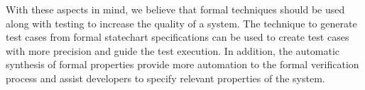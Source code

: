 With these aspects in mind, we believe that formal techniques should be used along with testing to increase the quality of a system. The technique to generate test cases from formal statechart specifications can be used to create test cases with more precision and guide the test execution. In addition, the automatic synthesis of formal properties provide more automation to the formal verification process and assist developers to specify relevant properties of the system.
